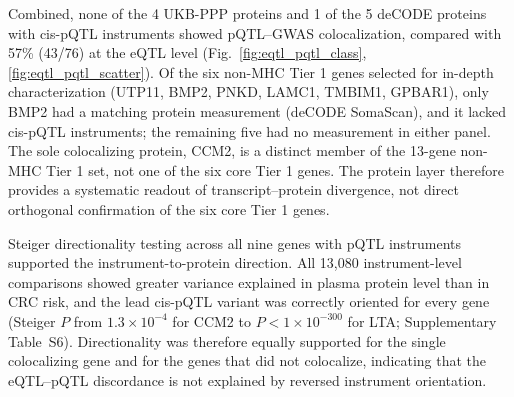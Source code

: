 \documentclass[11pt,a4paper]{article}
\begin{document}


Combined, none of the 4 UKB-PPP proteins and 1 of the 5 deCODE proteins with
cis-pQTL instruments showed pQTL--GWAS colocalization, compared with 57\% (43/76) at the eQTL
level (Fig.~\ref{fig:eqtl_pqtl_class}, \ref{fig:eqtl_pqtl_scatter}). Of the six non-MHC Tier 1 genes selected
for in-depth characterization (UTP11, BMP2, PNKD, LAMC1, TMBIM1, GPBAR1), only
BMP2 had a matching protein measurement (deCODE SomaScan), and it lacked
cis-pQTL instruments; the remaining five had no measurement in either panel.
The sole colocalizing protein, CCM2, is a distinct member of the 13-gene
non-MHC Tier 1 set, not one of the six core Tier 1 genes. The protein layer
therefore provides a systematic readout of transcript--protein divergence,
not direct orthogonal confirmation of the six core Tier 1 genes.

Steiger directionality testing across all nine genes with pQTL instruments
supported the instrument-to-protein direction. All 13,080 instrument-level
comparisons showed greater variance explained in plasma protein level than in
CRC risk, and the lead cis-pQTL variant was correctly oriented for every gene
(Steiger $P$ from $1.3\times10^{-4}$ for CCM2 to $P < 1\times10^{-300}$ for LTA;
Supplementary Table~S6). Directionality was therefore equally supported for the
single colocalizing gene and for the genes that did not colocalize, indicating
that the eQTL--pQTL discordance is not explained by reversed instrument
orientation.
\end{document}
